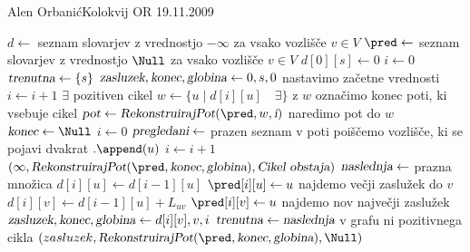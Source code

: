 \begin{naloga}{Alen Orbanić}{Kolokvij OR 19.11.2009}
\begin{odgovor}
\begin{enumerate}[(a)]
    
    \begin{small}
    \begin{algorithmic}
        \State $d \gets$ seznam slovarjev z vrednostjo $- \infty$ za vsako vozlišče $v \in V$
        \State $\pred \gets$ seznam slovarjev z vrednostjo $\Null$
        za vsako vozlišče $v \in V$
        \State $d[0][s] \gets 0$
        \State $i \gets 0$
        \State $\text{\sl trenutna} \gets \{s\}$
        \State $\text{\sl zasluzek}, \text{\sl konec}, \text{\sl globina} \gets 0,s,0$  \hfill nastavimo začetne vrednosti
            \State $i \gets i+1$
             \hfill $\exists$ pozitiven cikel
                \State $w\gets \{ u \mid d[i][u] \quad  \exists \}$ \hfill z $w$ označimo konec poti, ki vsebuje cikel
                \State $\text{\sl pot} \gets \text{\sl RekonstruirajPot}(\pred, w,\text{\sl i})$ \hfill naredimo pot do $w$
                \State $\text{\sl konec} \gets \Null$
                \State $i \gets 0$
                \State $\text{\sl pregledani} \gets$ prazen seznam
                 \hfill v poti poiščemo vozlišče, ki se pojavi dvakrat
                    $.\append(u)$
                    \EndIf
                    \State$i \gets i + 1$
                \EndFor
                \State \Return $(\infty, \text{\sl RekonstruirajPot}(\pred, \text{\sl konec},\text{\sl globina}),\text{\sl Cikel obstaja})$    
            \EndIf 
            \State $\text{\sl{naslednja}} \gets$ prazna množica
                \State $d[i][u] \gets d[i-1][u]$
                \State $\pred[i][u] \gets u$
                     \hfill najdemo večji zaslužek do $v$
                        \State $d[i][v] \gets d[i-1][u] +  L_{uv}$ 
                        \State $\pred[i][v] \gets u$
                    \EndIf
                     \hfill najdemo nov največji zaslužek
                        \State $\text{\sl zasluzek}, \text{\sl konec}, \text{\sl globina} \gets d[i][v],v,i$
                    \EndIf
                \EndFor
            \EndFor
            \State $\text{\sl{trenutna}} \gets \text{\sl{naslednja}}$
        \EndWhile \hfill v grafu ni pozitivnega cikla
        \State \Return $(zasluzek, \text{\sl RekonstruirajPot}(\pred, \text{\sl konec},\text{\sl globina}), \Null)$
    \EndFunction
    \end{algorithmic}
    

\end{small}
\end{enumerate}
\end{odgovor}
\end{naloga}
